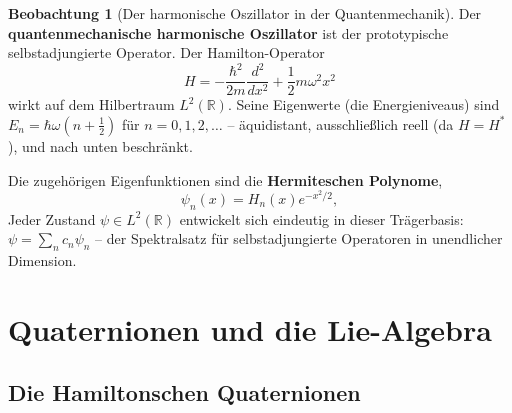 ﻿\documentclass[a4paper,12pt]{report}
\theoremstyle{definition}
\newtheorem{beobachtung}{Beobachtung}
\begin{document}
\begin{beobachtung}[Der harmonische Oszillator in der Quantenmechanik]
    Der \textbf{quantenmechanische harmonische Oszillator} ist der
    prototypische selbstadjungierte Operator. Der Hamilton-Operator
    \[
        H = -\frac{\hbar^2}{2m}\frac{d^2}{dx^2} + \frac{1}{2}m\omega^2 x^2
    \]
    wirkt auf dem Hilbertraum $L^2(\mathbb{R})$. Seine Eigenwerte
    (die Energieniveaus) sind $E_n = \hbar\omega(n + \frac{1}{2})$
    für $n = 0, 1, 2, \ldots$ -- äquidistant, ausschließlich reell
    (da $H = H^*$), und nach unten beschränkt.

    Die zugehörigen Eigenfunktionen sind die \textbf{Hermiteschen Polynome},
    \[
        \psi_n(x) = H_n(x) e^{-x^2/2},
    \]
    Jeder Zustand $\psi \in L^2(\mathbb{R})$ entwickelt sich eindeutig
    in dieser Trägerbasis: $\psi = \sum_n c_n \psi_n$ -- der
    Spektralsatz für selbstadjungierte Operatoren in
    unendlicher Dimension.
\end{beobachtung}

\chapter{Quaternionen und die Lie-Algebra}

\section{Die Hamiltonschen Quaternionen}
\end{document}
